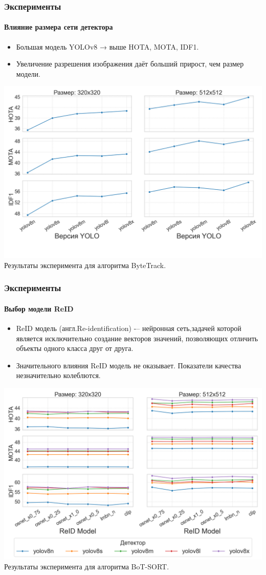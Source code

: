 \documentclass{beamer} %
\begin{document}
\begin{frame}
    \frametitle{Эксперименты}
    \framesubtitle{Влияние размера сети детектора}
    \begin{itemize}
      \item Большая модель YOLOv8 → выше HOTA, MOTA, IDF1.
      \item Увеличение разрешения изображения даёт больший прирост, чем размер модели.
    \end{itemize}
    \centering
    \includegraphics[width=0.7\linewidth]{images/plots/yolo_size_vs_metric/ByteTrack.png}\\
    \small Результаты эксперимента для алгоритма ByteTrack.
\end{frame}

\begin{frame}
  \frametitle{Эксперименты}
  \framesubtitle{Выбор модели ReID}
  \begin{itemize}
    \item ReID модель (англ.Re-identification) -– нейронная сеть,задачей которой
    является исключительно создание векторов значений, позволяющих отличить объекты одного класса друг от друга.
    \item Значительного влияния ReID модель не оказывает. Показатели качества незначительно колеблются.
  \end{itemize}
  \centering
  \includegraphics[width=0.7\linewidth]{images/plots/yolo_size_and_reid_vs_metric/BoT-SORT.png}\\
  \small Результаты эксперимента для алгоритма BoT-SORT.
\end{frame}
\end{document}
